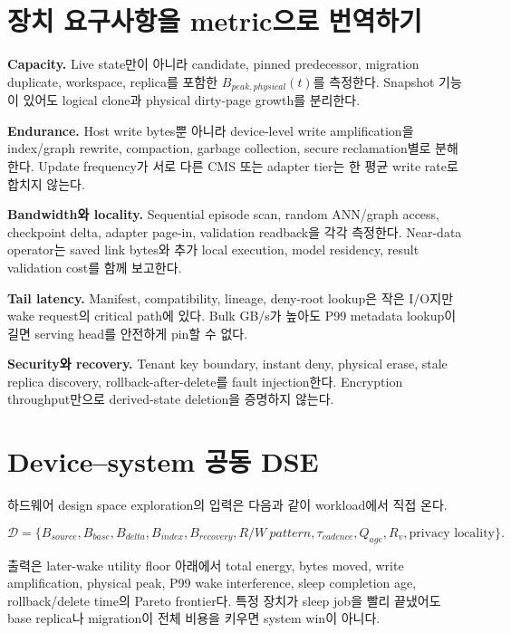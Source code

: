 \section{장치 요구사항을 metric으로 번역하기}

\textbf{Capacity.} Live state만이 아니라 candidate, pinned predecessor, migration duplicate, workspace,
replica를 포함한 $B_{peak,physical}(t)$를 측정한다. Snapshot 기능이 있어도 logical clone과 physical
dirty-page growth를 분리한다.

\textbf{Endurance.} Host write bytes뿐 아니라 device-level write amplification을 index/graph rewrite,
compaction, garbage collection, secure reclamation별로 분해한다. Update frequency가 서로 다른 CMS 또는
adapter tier는 한 평균 write rate로 합치지 않는다.

\textbf{Bandwidth와 locality.} Sequential episode scan, random ANN/graph access, checkpoint delta,
adapter page-in, validation readback을 각각 측정한다. Near-data operator는 saved link bytes와 추가 local
execution, model residency, result validation cost를 함께 보고한다.

\textbf{Tail latency.} Manifest, compatibility, lineage, deny-root lookup은 작은 I/O지만 wake request의
critical path에 있다. Bulk GB/s가 높아도 P99 metadata lookup이 길면 serving head를 안전하게 pin할 수
없다.

\textbf{Security와 recovery.} Tenant key boundary, instant deny, physical erase, stale replica discovery,
rollback-after-delete를 fault injection한다. Encryption throughput만으로 derived-state deletion을
증명하지 않는다.

\section{Device--system 공동 DSE}

하드웨어 design space exploration의 입력은 다음과 같이 workload에서 직접 온다.

\begin{equation}
\mathcal D=\{B_{source},B_{base},B_{delta},B_{index},B_{recovery},
R/W\ pattern,\tau_{cadence},Q_{age},R_v,\text{privacy locality}\}.
\end{equation}

출력은 later-wake utility floor 아래에서 total energy, bytes moved, write amplification, physical peak,
P99 wake interference, sleep completion age, rollback/delete time의 Pareto frontier다. 특정 장치가 sleep
job을 빨리 끝냈어도 base replica나 migration이 전체 비용을 키우면 system win이 아니다.

